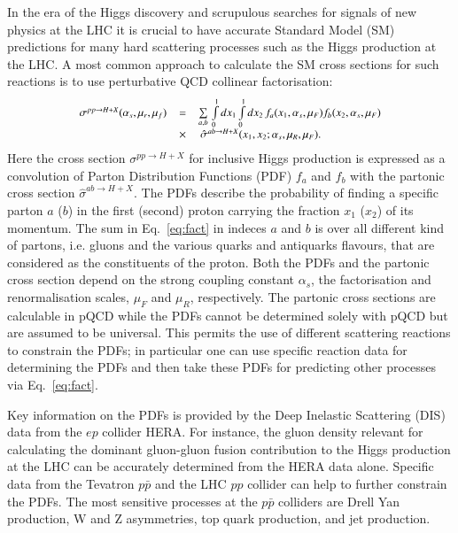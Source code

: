In the era of the Higgs discovery and scrupulous searches
for signals of new physics at the LHC it is crucial
to have accurate Standard Model (SM) predictions for
many hard scattering processes such as the Higgs production at the LHC.
A most common approach to calculate the SM cross sections for  
such reactions is to use perturbative QCD collinear factorisation:
\begin{equation}
\small
\begin{array}{lcl}
\sigma^{pp\rightarrow H + X}(\alpha_s,\mu_r,\mu_f) & = &
\sum\limits_{a,b}\,  \int\limits_{0}\limits^{1} dx_1 \int\limits_{0}\limits^{1} dx_2\, f_a(x_1,\alpha_s,\mu_F) 
 f_b(x_2,\alpha_s,\mu_F)\\ 
& \times & \, \hat{\sigma}^{ab \rightarrow H + X}(x_1,x_2;\alpha_s,\mu_R,\mu_F).\\
\end{array}
\label{eq:fact}
\end{equation}
Here the cross section $\sigma^{pp\rightarrow H + X}$ for inclusive
Higgs production is expressed
as a convolution of Parton Distribution Functions (PDF) $f_a$ and $f_b$
with the partonic cross section
$\hat{\sigma}^{ab \rightarrow H + X}$.
%
The PDFs describe 
the probability of finding a specific parton $a$ ($b$) in the first (second) proton carrying the fraction $x_1$ ($x_2$) of its momentum.
%
The sum in Eq.~\ref{eq:fact} in indeces $a$ and $b$ is over all different kind of partons,
i.e. gluons and the various quarks and antiquarks flavours, that are considered
as the constituents of the proton.
%
Both the PDFs and the partonic cross section depend on the strong coupling
constant $\alpha_s$, the factorisation and renormalisation scales,
$\mu_F$ and $\mu_R$, respectively.
%
The partonic cross sections are calculable in pQCD while
the PDFs cannot be determined solely with pQCD but are assumed 
to be universal.
%
This permits the use of different scattering reactions 
to constrain the PDFs; in particular one can use specific reaction data 
for determining the PDFs and then take these PDFs for
predicting other processes via Eq.~\ref{eq:fact}.
%

Key information on the PDFs is provided by the Deep Inelastic Scattering (DIS) data from the $ep$ collider HERA.
%
For instance, the gluon density relevant
for calculating the dominant gluon-gluon fusion contribution to the Higgs production
at the LHC can be accurately determined from the HERA data alone.
%
Specific data from the Tevatron $p\bar{p}$ and the LHC $pp$ collider
can help to further constrain the PDFs.
%
The most sensitive processes at the  $p\bar{p}$ colliders are
Drell Yan production, W and Z asymmetries, top quark production, and jet production.
%

